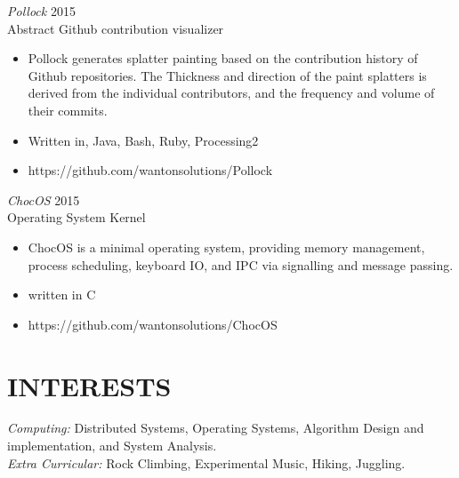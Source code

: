\documentclass[line,margin]{res}
\begin{document}
\begin{resume}
{\sl Pollock} \hfill 2015\\
	Abstract Github contribution visualizer
\begin{itemize} \itemsep -2pt
		\item Pollock generates splatter painting based on the contribution history of Github repositories. The Thickness and direction of the paint splatters is derived from the individual contributors, and the frequency and volume of their commits.
		\item Written in, Java, Bash, Ruby, Processing2
		\item https://github.com/wantonsolutions/Pollock
\end{itemize}

{\sl ChocOS} \hfill 2015\\
	Operating System Kernel
\begin{itemize} \itemsep -2pt
		\item ChocOS is a minimal operating system, providing memory management, process scheduling, keyboard IO, and IPC via signalling and message passing.
		\item written in C
		\item https://github.com/wantonsolutions/ChocOS
\end{itemize}

\section{INTERESTS}
	{\sl Computing:}  Distributed Systems, Operating Systems, Algorithm Design and implementation, and System Analysis.\\
	{\sl Extra Curricular:} Rock Climbing, Experimental Music, Hiking, Juggling.\\

\end{resume}
\end{document}
